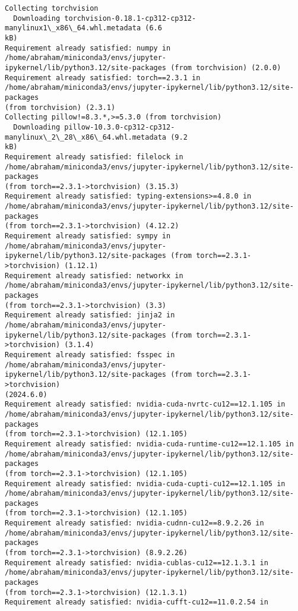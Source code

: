 \documentclass[11pt]{article}
\begin{document}
    \begin{Verbatim}[commandchars=\\\{\}]
Collecting torchvision
  Downloading torchvision-0.18.1-cp312-cp312-manylinux1\_x86\_64.whl.metadata (6.6
kB)
Requirement already satisfied: numpy in /home/abraham/miniconda3/envs/jupyter-
ipykernel/lib/python3.12/site-packages (from torchvision) (2.0.0)
Requirement already satisfied: torch==2.3.1 in
/home/abraham/miniconda3/envs/jupyter-ipykernel/lib/python3.12/site-packages
(from torchvision) (2.3.1)
Collecting pillow!=8.3.*,>=5.3.0 (from torchvision)
  Downloading pillow-10.3.0-cp312-cp312-manylinux\_2\_28\_x86\_64.whl.metadata (9.2
kB)
Requirement already satisfied: filelock in
/home/abraham/miniconda3/envs/jupyter-ipykernel/lib/python3.12/site-packages
(from torch==2.3.1->torchvision) (3.15.3)
Requirement already satisfied: typing-extensions>=4.8.0 in
/home/abraham/miniconda3/envs/jupyter-ipykernel/lib/python3.12/site-packages
(from torch==2.3.1->torchvision) (4.12.2)
Requirement already satisfied: sympy in /home/abraham/miniconda3/envs/jupyter-
ipykernel/lib/python3.12/site-packages (from torch==2.3.1->torchvision) (1.12.1)
Requirement already satisfied: networkx in
/home/abraham/miniconda3/envs/jupyter-ipykernel/lib/python3.12/site-packages
(from torch==2.3.1->torchvision) (3.3)
Requirement already satisfied: jinja2 in /home/abraham/miniconda3/envs/jupyter-
ipykernel/lib/python3.12/site-packages (from torch==2.3.1->torchvision) (3.1.4)
Requirement already satisfied: fsspec in /home/abraham/miniconda3/envs/jupyter-
ipykernel/lib/python3.12/site-packages (from torch==2.3.1->torchvision)
(2024.6.0)
Requirement already satisfied: nvidia-cuda-nvrtc-cu12==12.1.105 in
/home/abraham/miniconda3/envs/jupyter-ipykernel/lib/python3.12/site-packages
(from torch==2.3.1->torchvision) (12.1.105)
Requirement already satisfied: nvidia-cuda-runtime-cu12==12.1.105 in
/home/abraham/miniconda3/envs/jupyter-ipykernel/lib/python3.12/site-packages
(from torch==2.3.1->torchvision) (12.1.105)
Requirement already satisfied: nvidia-cuda-cupti-cu12==12.1.105 in
/home/abraham/miniconda3/envs/jupyter-ipykernel/lib/python3.12/site-packages
(from torch==2.3.1->torchvision) (12.1.105)
Requirement already satisfied: nvidia-cudnn-cu12==8.9.2.26 in
/home/abraham/miniconda3/envs/jupyter-ipykernel/lib/python3.12/site-packages
(from torch==2.3.1->torchvision) (8.9.2.26)
Requirement already satisfied: nvidia-cublas-cu12==12.1.3.1 in
/home/abraham/miniconda3/envs/jupyter-ipykernel/lib/python3.12/site-packages
(from torch==2.3.1->torchvision) (12.1.3.1)
Requirement already satisfied: nvidia-cufft-cu12==11.0.2.54 in

\end{Verbatim}
\end{document}
